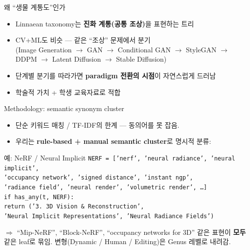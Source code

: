 \documentclass[aspectratio=169,t]{beamer}
\newcommand{\hot}[1]{\textcolor{accentorange}{\textbf{#1}}}
\newcommand{\cool}[1]{\textcolor{accentblue}{\textbf{#1}}}
\newcommand{\muted}[1]{\textcolor{mutedgray}{#1}}
\begin{document}
\begin{frame}{왜 ``생물 계통도''인가}
\begin{itemize}
  \item Linnaean taxonomy는 \hot{진화 계통(공통 조상)}을 표현하는 트리
  \item CV+ML도 비슷 — 같은 ``조상'' 문제에서 분기 \\
        \muted{(Image Generation $\to$ GAN $\to$ Conditional GAN $\to$ StyleGAN $\to$ DDPM $\to$ Latent Diffusion $\to$ Stable Diffusion)}
  \item 단계별 분기를 따라가면 \cool{paradigm 전환의 시점}이 자연스럽게 드러남
  \item 학술적 가치 + 학생 교육자료로 적합
\end{itemize}
\end{frame}

\begin{frame}{Methodology: semantic synonym cluster}
\begin{itemize}
  \item 단순 키워드 매칭 / TF-IDF의 한계 — 동의어를 못 잡음.
  \item 우리는 \hot{rule-based + manual semantic cluster}로 명시적 분류:
\end{itemize}
\vfill
\begin{block}{예: NeRF / Neural Implicit}
\small
\texttt{NERF = ['nerf', 'neural radiance', 'neural implicit',} \\
\texttt{\quad\quad'occupancy network', 'signed distance', 'instant ngp',} \\
\texttt{\quad\quad'radiance field', 'neural render', 'volumetric render', \dots]}\\[6pt]
\texttt{if has\_any(t, NERF):} \\
\texttt{\quad return ('3. 3D Vision \& Reconstruction',} \\
\texttt{\quad\quad'Neural Implicit Representations', 'Neural Radiance Fields')}
\end{block}
\vfill
\muted{$\Rightarrow$ ``Mip-NeRF'', ``Block-NeRF'', ``occupancy networks for 3D''
같은 표현이 \cool{모두} 같은 leaf로 묶임. 변형(Dynamic / Human / Editing)은 Genus 레벨로 내려감.}
\end{frame}
\end{document}
